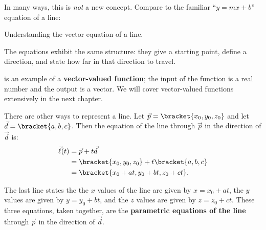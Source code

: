 In many ways, this is \emph{not} a new concept. Compare  to the familiar ``$y=mx+b$'' equation of a line:
\begin{center}
\captionsetup{type=figure}%
\caption{Understanding the vector equation of a line.}
\label{fig:lines_eq}
\end{center}

The equations exhibit the same structure: they give a starting point, define a direction, and state how far in that direction to travel.

 is an example of a \textbf{vector-valued function}; the input of the function is a real number and the output is a vector. We will cover vector-valued functions extensively in the next chapter.

There are other ways to represent a line. Let $\vec p =\bracket{x_0,y_0,z_0}$ and let $\vec d =\bracket{a,b,c}$. Then the equation of the line through $\vec p$ in the direction of $\vec d$ is:
\begin{align*}
\vec\ell(t) &= \vec p + t\vec d \\
						&=\bracket{x_0,y_0,z_0}+ t\bracket{a,b,c}\\
						&=\bracket{x_0 + at, y_0+bt, z_0+ct}.
\end{align*}

The last line states the the $x$ values of the line are given by $x=x_0+at$, the $y$ values are given by $y = y_0+bt$, and the $z$ values are given by $z = z_0 + ct$. These three equations, taken together, are the \textbf{parametric equations of the line} through $\vec p$ in the direction of $\vec d$.


